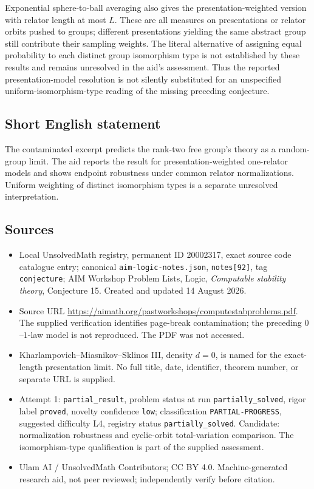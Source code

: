 \documentclass[11pt]{article}
\begin{document}
Exponential sphere-to-ball averaging also gives the presentation-weighted version with relator length at most \(L\). These are all measures on presentations or relator orbits pushed to groups; different presentations yielding the same abstract group still contribute their sampling weights. The literal alternative of assigning equal probability to each distinct group isomorphism type is not established by these results and remains unresolved in the aid's assessment. Thus the reported presentation-model resolution is not silently substituted for an unspecified uniform-isomorphism-type reading of the missing preceding conjecture.
\subsection{Short English statement}
The contaminated excerpt predicts the rank-two free group's theory as a random-group limit. The aid reports the result for presentation-weighted one-relator models and shows endpoint robustness under common relator normalizations. Uniform weighting of distinct isomorphism types is a separate unresolved interpretation.
\subsection{Sources}
\begin{itemize}
\item Local UnsolvedMath registry, permanent ID 20002317, exact source code catalogue entry; canonical \texttt{aim-logic-notes.json}, \texttt{notes[92]}, tag \texttt{conjecture}; AIM Workshop Problem Lists, Logic, \emph{Computable stability theory}, Conjecture 15. Created and updated 14 August 2026.
\item Source URL \url{https://aimath.org/pastworkshops/computestabproblems.pdf}. The supplied verification identifies page-break contamination; the preceding \(0\)--\(1\)-law model is not reproduced. The PDF was not accessed.
\item Kharlampovich--Miasnikov--Sklinos III, density \(d=0\), is named for the exact-length presentation limit. No full title, date, identifier, theorem number, or separate URL is supplied.
\item Attempt 1: \texttt{partial\_result}, problem status at run \texttt{partially\_solved}, rigor label \texttt{proved}, novelty confidence \texttt{low}; classification \texttt{PARTIAL-PROGRESS}, suggested difficulty L4, registry status \texttt{partially\_solved}. Candidate: normalization robustness and cyclic-orbit total-variation comparison. The isomorphism-type qualification is part of the supplied assessment.
\item Ulam AI / UnsolvedMath Contributors; CC BY 4.0. Machine-generated research aid, not peer reviewed; independently verify before citation.
\end{itemize}
\end{document}
